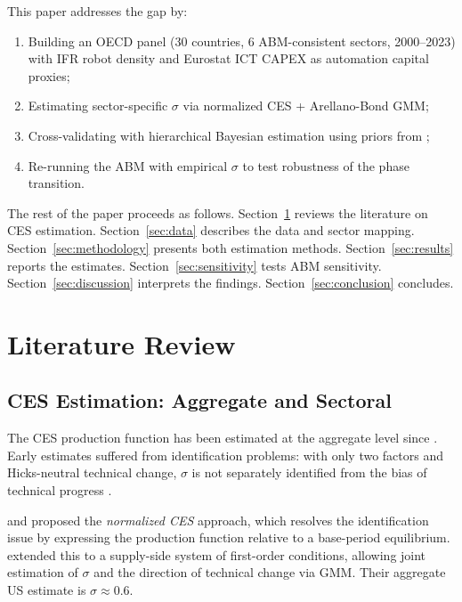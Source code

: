 \documentclass[11pt,a4paper]{article}
\begin{document}
This paper addresses the gap by:
\begin{enumerate}
    \item Building an OECD panel (30 countries, 6 ABM-consistent sectors, 2000--2023) with IFR robot density and Eurostat ICT CAPEX as automation capital proxies;
    \item Estimating sector-specific $\sigma$ via normalized CES + Arellano-Bond GMM;
    \item Cross-validating with hierarchical Bayesian estimation using priors from \autocite{knoblach2020what};
    \item Re-running the ABM with empirical $\sigma$ to test robustness of the phase transition.
\end{enumerate}

The rest of the paper proceeds as follows.
Section~\ref{sec:literature} reviews the literature on CES estimation.
Section~\ref{sec:data} describes the data and sector mapping.
Section~\ref{sec:methodology} presents both estimation methods.
Section~\ref{sec:results} reports the estimates.
Section~\ref{sec:sensitivity} tests ABM sensitivity.
Section~\ref{sec:discussion} interprets the findings.
Section~\ref{sec:conclusion} concludes.


\section{Literature Review}
\label{sec:literature}

\subsection{CES Estimation: Aggregate and Sectoral}

The CES production function has been estimated at the aggregate level since \autocite{arrow1961capital}.
Early estimates suffered from identification problems: with only two factors and Hicks-neutral technical change, $\sigma$ is not separately identified from the bias of technical progress \autocite{leonledesma2010identifying}.

\autocite{klump2007normalization} and \autocite{klump2012normalization} proposed the \emph{normalized CES} approach, which resolves the identification issue by expressing the production function relative to a base-period equilibrium.
\autocite{leonledesma2010identifying} extended this to a supply-side system of first-order conditions, allowing joint estimation of $\sigma$ and the direction of technical change via GMM.
Their aggregate US estimate is $\sigma \approx 0.6$.
\end{document}

